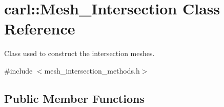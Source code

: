 \hypertarget{classcarl_1_1_mesh___intersection}{}\section{carl\+:\+:Mesh\+\_\+\+Intersection Class Reference}
\label{classcarl_1_1_mesh___intersection}


Class used to construct the intersection meshes.  




{\ttfamily \#include $<$mesh\+\_\+intersection\+\_\+methods.\+h$>$}

\subsection*{Public Member Functions}
